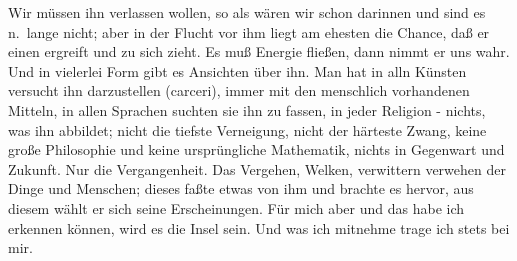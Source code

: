 \documentclass[
]{article}
\begin{document}
Wir müssen ihn verlassen wollen, so als wären wir schon darinnen und
sind es n.~lange nicht; aber in der Flucht vor ihm liegt am ehesten die
Chance, daß er einen ergreift und zu sich zieht. Es muß Energie fließen,
dann nimmt er uns wahr. Und in vielerlei Form gibt es Ansichten über
ihn. Man hat in alln Künsten versucht ihn darzustellen (carceri), immer
mit den menschlich vorhandenen Mitteln, in allen Sprachen suchten sie
ihn zu fassen, in jeder Religion - nichts, was ihn abbildet; nicht die
tiefste Verneigung, nicht der härteste Zwang, keine große Philosophie
und keine ursprüngliche Mathematik, nichts in Gegenwart und Zukunft. Nur
die Vergangenheit. Das Vergehen, Welken, verwittern verwehen der Dinge
und Menschen; dieses faßte etwas von ihm und brachte es hervor, aus
diesem wählt er sich seine Erscheinungen. Für mich aber und das habe ich
erkennen können, wird es die Insel sein. Und was ich mitnehme trage ich
stets bei mir.
\end{document}
